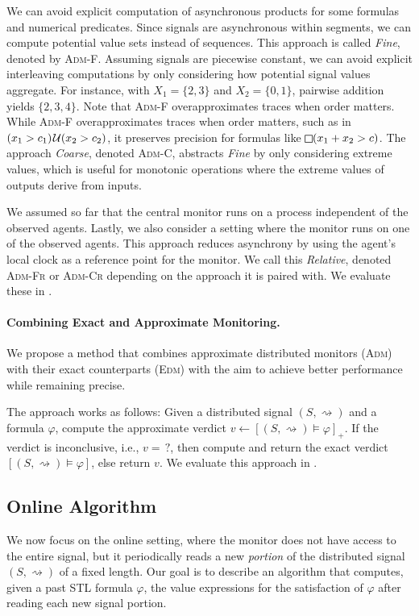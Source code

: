 \documentclass[iicol,lineno]{sn-jnl}
\renewcommand{\cref}{\Cref}
\newcommand{\hb}{\rightsquigarrow}
\renewcommand{\LTLg}{\LTLsquare}
\let\LTLalways\LTLg
\def\until{\kern.1em\mathcal{U}}
\newcommand{\?}{\text{?}}
\begin{document}
	We can avoid explicit computation of asynchronous products for some formulas and numerical predicates.
	Since signals are asynchronous within segments, we can compute potential value sets instead of sequences.
	This approach is called \emph{Fine}, denoted by \textsc{Adm-F}.
	Assuming signals are piecewise constant, we can avoid explicit interleaving computations by only considering how potential signal values aggregate.
	For instance, with $X_1 = \{2,3\}$ and $X_2 = \{0,1\}$, pairwise addition yields $\{2, 3, 4\}$.
	Note that \textsc{Adm-F} overapproximates traces when order matters.
	While \textsc{Adm-F} overapproximates traces when order matters, such as in $(x_1 > c_1) \until (x_2 > c_2)$, it preserves precision for formulas like $\LTLalways(x_1 + x_2 > c)$.
	The approach \emph{Coarse}, denoted \textsc{Adm-C}, abstracts \emph{Fine} by only considering extreme values, which is useful for monotonic operations where the extreme values of outputs derive from inputs.
	
	We assumed so far that the central monitor runs on a process independent of the observed agents.
	Lastly, we also consider a setting where the monitor runs on one of the observed agents.
	This approach reduces asynchrony by using the agent's local clock as a reference point for the monitor.
	We call this \emph{Relative}, denoted \textsc{Adm-Fr} or \textsc{Adm-Cr} depending on the approach it is paired with.
	We evaluate these in \cref{sec:experiments}.
	
	\paragraph*{Combining Exact and Approximate Monitoring.}
	We propose a method that combines approximate distributed monitors (\textsc{Adm}) with their exact counterparts (\textsc{Edm}) with the aim to achieve better performance while remaining precise.
	
	The approach works as follows:
	Given a distributed signal $(S,{\hb})$ and a formula $\varphi$, compute the approximate verdict $v \gets [(S,{\hb}) \models \varphi]_+$.
	If the verdict is inconclusive, i.e., $v = {\,?}$, then compute and return the exact verdict $[(S,{\hb}) \models \varphi]$, else return $v$.
	We evaluate this approach in \cref{sec:experiments}.
	
	\bgroup \color{red}
	\subsection{Online Algorithm}\label{sec:online}
	We now focus on the online setting, where the monitor does not have access to the entire signal, but it periodically reads a new \emph{portion} of the distributed signal $(S,{\hb})$ of a fixed length.
	Our goal is to describe an algorithm that computes, given a past STL formula $\varphi$, the value expressions for the satisfaction of $\varphi$ after reading each new signal portion.
	
\end{document}
